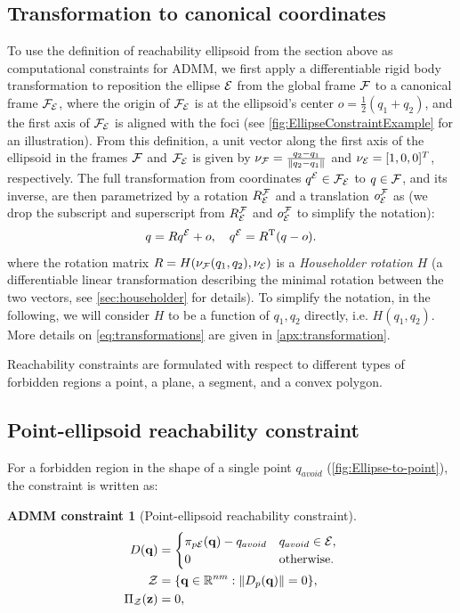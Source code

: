 \documentclass[10pt,twocolumn,twoside]{IEEEtran}
\newtheorem{constraint}{ADMM constraint}
\newcommand{\new}[1]{\textcolor{blue}{#1}}
\def\sZ{\mathcal{Z}}
\begin{document}
\subsection{Transformation to canonical coordinates}\label{sec:rotation2Standard}
\newcommand{\oFE}{o}
To use the definition of reachability ellipsoid from the section above as computational constraints for ADMM, we first apply a differentiable rigid body transformation to reposition the ellipse $\mathcal{E}$ from the global frame $\mathcal{F}$ to a canonical frame $\mathcal{F}_{\mathcal{E}}$, where the origin of $\mathcal{F}_{\mathcal{E}}$ is at the ellipsoid's center $\oFE = \frac{1}{2}(q_1+q_2)$, and the first axis of $\mathcal{F}_{\mathcal{E}}$ is aligned with the foci (see \cref{fig:EllipseConstraintExample} for an illustration). 
From this definition, a unit vector along the first axis of the ellipsoid in the frames $\mathcal{F}$ and $\mathcal{F}_{\mathcal{E}}$ is given by $\nu_{\mathcal{F}} = \frac{q_2-q_1}{\lVert q_2-q_1\rVert}$ and $\nu_{\mathcal{E}} =[1,0,0]^T$, respectively.
The full transformation from coordinates \new{$q^{\mathcal{E}}\in\mathcal{F}_{\mathcal{E}}$} to $q\in\mathcal{F}$, and its inverse, are then parametrized by a rotation $R^{\mathcal{F}}_{\mathcal{E}}$ and a translation $o^{\mathcal{F}}_{\mathcal{E}}$ as (we drop the subscript and superscript from $R^{\mathcal{F}}_{\mathcal{E}}$ and $o^{\mathcal{F}}_{\mathcal{E}}$ to simplify the notation):
\begin{equation}\label{eq:transformations}
  q=R\Eframe{q}+\oFE,\quad
  \Eframe{q}=R\transpose(q-\oFE).
\end{equation}
where the rotation matrix $R=H(\nu_{\mathcal{F}}(q_1,q_2),\nu_{\mathcal{E}})$ is a \emph{Householder rotation} $H$ (a differentiable linear transformation describing the minimal rotation between the two vectors, see \cref{sec:householder} for details).  To simplify the notation, in the following, we will consider $H$ to be a function of $q_1,q_2$ directly, i.e. $H(q_1,q_2)$. More details on \eqref{eq:transformations} are given in \cref{apx:transformation}.

  Reachability constraints are formulated with respect to different types of forbidden regions a point, a plane, a segment, and a convex polygon.

\subsection{Point-ellipsoid reachability constraint}\label{sec:ellipsoid-point}
 For a forbidden region in the shape of a single point $q_{avoid}$ (\cref{fig:Ellipse-to-point}), the constraint is written as:
\begin{constraint}[Point-ellipsoid reachability constraint]
\begin{align}
D(\vq) &=  \begin{cases}
      \pi_{p\cE}(\vq) - q_{avoid} & q_{avoid} \in \cE, \\
      {0} & \textrm{otherwise}.
    \end{cases} \label{eq:point_ellipsoid_constraint}\\
  \sZ &= \{\vq\in\mathbb{R}^{nm}:\norm{D_p(\vq)} = 0 \},\\
   \Pi_\sZ(\vz) & = 0, 
\end{align}
\end{constraint}
\end{document}

